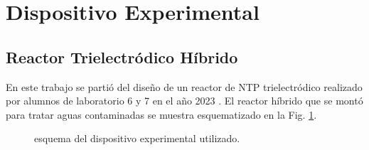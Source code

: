     \section{Dispositivo Experimental}
		\subsection{Reactor Trielectródico Híbrido}
En este trabajo se partió del diseño de un reactor de NTP trielectródico realizado por alumnos de laboratorio 6 y 7 en el año 2023 . El reactor híbrido que se montó para tratar aguas contaminadas se muestra esquematizado en la Fig. \ref{fig:Esquema Reactor}. \\
\begin{figure}[!htbp] \centering
    \vspace{-.25cm}
    \vspace{-.25cm}
    \caption{esquema del dispositivo experimental utilizado.}
    \label{fig:Esquema Reactor}
\end{figure}

